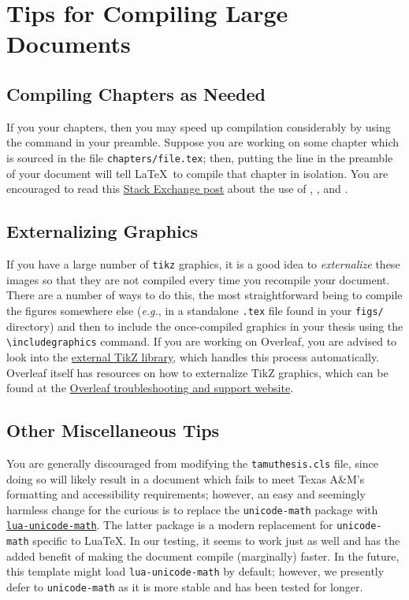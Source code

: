 \chapter{Tips for Compiling Large Documents}\label{appx:compile-time}
\section{Compiling Chapters as Needed}
If you \verb|| your chapters, then you may speed up compilation considerably by using the \verb|| command in your preamble.
Suppose you are working on some chapter which is sourced in the file \verb|chapters/file.tex|; then, putting the line \verb|| in the preamble of your document will tell \LaTeX\ to compile that chapter in isolation.
You are encouraged to read this \href{https://tex.stackexchange.com/questions/246/when-should-i-use-input-vs-include}{Stack Exchange post} about the use of \verb||, \verb||, and \verb||.

\section{Externalizing Graphics}
If you have a large number of \texttt{tikz} graphics, it is a good idea to \textit{externalize} these images so that they are not compiled every time you recompile your document.
There are a number of ways to do this, the most straightforward being to compile the figures somewhere else (\textit{e.g.}, in a standalone \texttt{.tex} file found in your \verb|figs/| directory) and then to include the once-compiled graphics in your thesis using the \verb|\includegraphics| command.
If you are working on Overleaf, you are advised to look into the  \href{https://tikz.dev/library-external}{external TikZ library}, which handles this process automatically.
Overleaf itself has resources on how to externalize TikZ graphics, which can be found at the \href{https://docs.overleaf.com/troubleshooting-and-support/fixing-and-preventing-compile-timeouts/reducing-the-compile-time-for-diagrams}{Overleaf troubleshooting and support website}.

\section{Other Miscellaneous Tips}
You are generally discouraged from modifying the \texttt{tamuthesis.cls} file, since doing so will likely result in a document which fails to meet Texas A\&M's formatting and accessibility requirements; however, an easy and seemingly harmless change for the curious is to replace the \texttt{unicode-math} package with \href{https://ctan.org/pkg/lua-unicode-math}{\texttt{lua-unicode-math}}.
The latter package is a modern replacement for \texttt{unicode-math} specific to Lua\TeX.
In our testing, it seems to work just as well and has the added benefit of making the document compile (marginally) faster.
In the future, this template might load \texttt{lua-unicode-math} by default; however, we presently defer to \texttt{unicode-math} as it is more stable and has been tested for longer.
